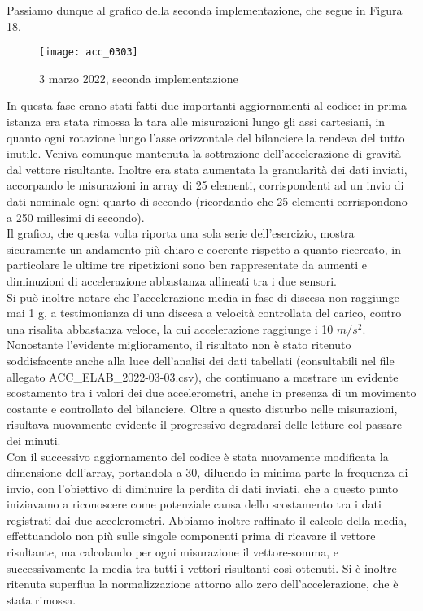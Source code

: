 \documentclass[fleqn,10pt]{SelfArx} %
\begin{document}
Passiamo dunque al grafico della seconda implementazione, che segue in Figura 18.

\begin{figure}[htb]\centering
	\texttt{[image: acc\_0303]}
	\caption{3 marzo 2022, seconda implementazione}
	\label{fig:accelerazione 0303}
\end{figure}

In questa fase erano stati fatti due importanti aggiornamenti al codice: in prima istanza era stata rimossa la tara alle 
misurazioni lungo gli assi cartesiani, in quanto ogni rotazione lungo l'asse orizzontale del bilanciere la rendeva del tutto 
inutile. Veniva comunque mantenuta la sottrazione dell'accelerazione di gravità dal vettore risultante. Inoltre era stata 
aumentata la granularità dei dati inviati, accorpando le misurazioni in array di 25 elementi, corrispondenti ad un invio 
di dati nominale ogni quarto di secondo (ricordando che 25 elementi corrispondono a 250 millesimi di secondo).\\
Il grafico, che questa volta riporta una sola serie dell'esercizio, mostra sicuramente un andamento più chiaro e coerente 
rispetto a quanto ricercato, in particolare le ultime tre ripetizioni sono ben rappresentate da aumenti e diminuzioni di 
accelerazione abbastanza allineati tra i due sensori.\\
Si può inoltre notare che l'accelerazione media in fase di discesa non raggiunge mai 1 g, a testimonianza di una discesa 
a velocità controllata del carico, contro una risalita abbastanza veloce, la cui accelerazione raggiunge i 10 $ m/s^2 $.\\

Nonostante l'evidente miglioramento, il risultato non è stato ritenuto soddisfacente anche alla luce dell'analisi dei dati 
tabellati (consultabili nel file allegato ACC\_ELAB\_2022-03-03.csv), che continuano a mostrare un evidente scostamento tra 
i valori dei due accelerometri, anche in presenza di un movimento costante e controllato del bilanciere.
Oltre a questo disturbo nelle misurazioni, risultava nuovamente evidente il progressivo degradarsi delle letture col passare 
dei minuti.\\

Con il successivo aggiornamento del codice è stata nuovamente modificata la dimensione dell'array, portandola a 30, diluendo 
in minima parte la frequenza di invio, con l'obiettivo di diminuire la perdita di dati inviati, che a questo punto iniziavamo 
a riconoscere come potenziale causa dello scostamento tra i dati registrati dai due accelerometri. Abbiamo inoltre raffinato 
il calcolo della media, effettuandolo non più sulle singole componenti prima di ricavare il vettore risultante, ma calcolando 
per ogni misurazione il vettore-somma, e successivamente la media tra tutti i vettori risultanti così ottenuti. Si è inoltre 
ritenuta superflua la normalizzazione attorno allo zero dell'accelerazione, che è stata rimossa.
\end{document}
